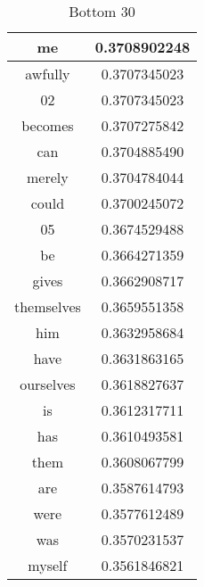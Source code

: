 \documentclass{article}
\begin{document}
\begin{table}[ht]
{\begin{tabular}{|c|c|}
\hline
me & 0.3708902248 \\
\hline
awfully & 0.3707345023 \\
\hline
02 & 0.3707345023 \\
\hline
becomes & 0.3707275842 \\
\hline
can & 0.3704885490 \\
\hline
merely & 0.3704784044 \\
\hline
could & 0.3700245072 \\
\hline
05 & 0.3674529488 \\
\hline
be & 0.3664271359 \\
\hline
gives & 0.3662908717 \\
\hline
themselves & 0.3659551358 \\
\hline
him & 0.3632958684 \\
\hline
have & 0.3631863165 \\
\hline
ourselves & 0.3618827637 \\
\hline
is & 0.3612317711 \\
\hline
has & 0.3610493581 \\
\hline
them & 0.3608067799 \\
\hline
are & 0.3587614793 \\
\hline
were & 0.3577612489 \\
\hline
was & 0.3570231537 \\
\hline
myself & 0.3561846821 \\
\hline
\end{tabular}
\caption{Bottom 30}
}
\end{table}\\\\
\end{document}
